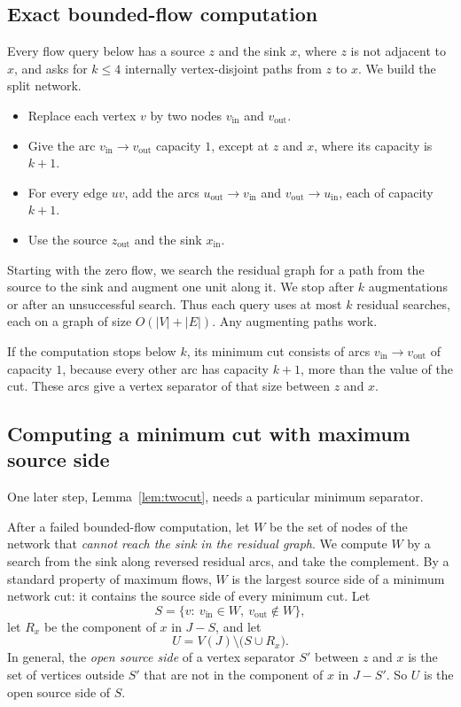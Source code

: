 \documentclass[11pt]{article}
\newcommand{\vin}[1]{#1_{\mathrm{in}}}
\newcommand{\vout}[1]{#1_{\mathrm{out}}}
\begin{document}
\subsection{Exact bounded-flow computation}\label{sec:flow}

Every flow query below has a source $z$ and the sink $x$, where $z$ is not
adjacent to $x$, and asks for $k\le4$ internally vertex-disjoint paths from
$z$ to $x$. We build the split network.
\begin{itemize}[nosep]
\item Replace each vertex $v$ by two nodes $\vin v$ and $\vout v$.
\item Give the arc $\vin v\to\vout v$ capacity $1$, except at $z$ and $x$,
where its capacity is $k+1$.
\item For every edge $uv$, add the arcs $\vout u\to\vin v$ and $\vout v\to\vin u$,
each of capacity $k+1$.
\item Use the source $\vout z$ and the sink $\vin x$.
\end{itemize}
Starting with the zero flow, we search the residual graph for a path from the
source to the sink and augment one unit along it. We stop after $k$
augmentations or after an unsuccessful search. Thus each query uses at most
$k$ residual searches, each on a graph of size $O(|V|+|E|)$. Any augmenting
paths work.

If the computation stops below $k$, its minimum cut consists of arcs
$\vin v\to\vout v$ of capacity $1$, because every other arc has capacity $k+1$,
more than the value of the cut. These arcs give a vertex separator of that size
between $z$ and $x$.

\subsection{Computing a minimum cut with maximum source side}\label{sec:maxcut}

One later step, Lemma~\ref{lem:twocut}, needs a particular minimum separator.

After a failed bounded-flow computation, let $W$ be the set of nodes of the
network that \emph{cannot reach the sink in the residual graph}. We compute
$W$ by a search from the sink along reversed residual arcs, and take the
complement. By a standard property of maximum flows, $W$ is the largest source
side of a minimum network cut: it contains the source side of every minimum
cut. Let
\begin{equation*}
S=\{v:\ \vin v\in W,\ \vout v\notin W\},
\end{equation*}
let $R_x$ be the component of $x$ in $J-S$, and let
\begin{equation*}
U=V(J)\setminus\bigl(S\cup R_x\bigr).
\end{equation*}
In general, the \emph{open source side} of a vertex separator $S'$ between $z$
and $x$ is the set of vertices outside $S'$ that are not in the component of
$x$ in $J-S'$. So $U$ is the open source side of $S$.
\end{document}
